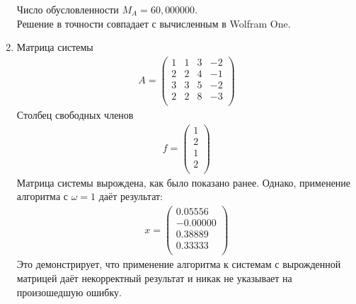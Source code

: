 \documentclass[a4paper,12pt,titlepage,finall]{article}
\begin{document}
\begin{enumerate}
Число обусловленности $M_A = 60,000000$.\\
Решение в точности совпадает с вычисленным в Wolfram One.
\item
Матрица системы
\begin{align*}
A = \begin{pmatrix}
1&     1&     3&    -2 \\
   2&     2&     4&    -1 \\
   3&     3&     5&    -2 \\
   2&     2&     8&    -3 \\
\end{pmatrix}
\end{align*}
Столбец свободных членов
\begin{align*}
f = \begin{pmatrix}
1 \\
2 \\
1 \\
2 \\
\end{pmatrix}
\end{align*}
Матрица системы вырождена, как было показано ранее. Однако, применение алгоритма с $\omega = 1$ даёт результат:
\begin{align*}
x = \begin{pmatrix}
0.05556 \\
  -0.00000\\ 
   0.38889 \\
   0.33333 \\
\end{pmatrix}
\end{align*}
Это демонстрирует, что применение алгоритма к системам с вырожденной матрицей даёт некорректный результат и никак не указывает на произошедшую ошибку.


\end{enumerate}
\end{document}
